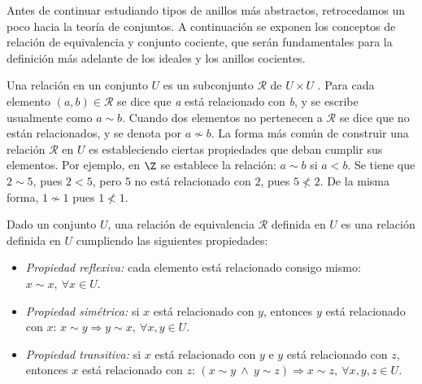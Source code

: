 \begin{TFGampliado}
    Antes de continuar estudiando tipos de anillos más abstractos, retrocedamos un poco hacia la teoría de conjuntos. A continuación se exponen los conceptos de relación de equivalencia y conjunto cociente, que serán fundamentales para la definición más adelante de los ideales y los anillos cocientes.\medskip
    
    Una relación en un conjunto $U$ es un subconjunto $\mathcal{R}$ de $ U \times U$ \cite[pp.~59-60]{LenguajePineda}. Para cada elemento $(a,b) \in \mathcal{R}$ se dice que \textit{a} está relacionado con \textit{b}, y se escribe usualmente como $a \sim b$. Cuando dos elementos no pertenecen a $\mathcal{R}$ se dice que no están relacionados, y se denota por $a \not\sim b$. La forma más común de construir una relación $\mathcal{R}$ en $U$ es estableciendo ciertas propiedades que deban cumplir sus elementos. Por ejemplo, en $\Z$ se establece la relación: $a \sim b$ si $a < b$. Se tiene que $2 \sim  5$, pues $2 < 5$, pero $5$ no está relacionado con $2$, pues $5 \not< 2$. De la misma forma, $1 \not\sim 1$ pues $1 \not< 1$.
    
    
    \begin{deff}{\cite[p.~77]{LenguajePineda}}
    Dado un conjunto $U$, una relación de equivalencia $\mathcal{R}$ definida en $U$ es una relación definida en $U$ cumpliendo las siguientes propiedades:
    
        \begin{itemize}
            \item \textit{Propiedad reflexiva:} cada elemento está relacionado consigo mismo: $x \sim x, \ \forall x \in U$.
            \item \textit{Propiedad simétrica:} si $x$ está relacionado con $y$, entonces $y$ está relacionado con $x$: $ x \sim y \Rightarrow y \sim x, \ \forall x,y \in U$.
            \item \textit{Propiedad transitiva:} si $x$ está relacionado con $y$ e $y$ está relacionado con $z$, entonces $x$ está relacionado con $z$: $ (x \sim y \ \land \ y\sim z)\Rightarrow x \sim z, \ \forall x,y,z \in U$.
        \end{itemize}
    
    \end{deff}
    

\end{TFGampliado}
